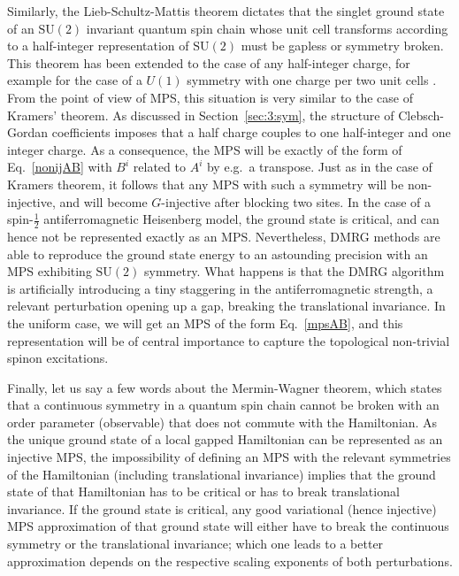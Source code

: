\documentclass[rmp,aps,reprint,superscriptaddress,nobalancelastpage]{revtex4-1}
\newcommand{\SU}{\mathrm{SU}}
\begin{document}
Similarly, the Lieb-Schultz-Mattis theorem dictates that the singlet ground state of an $\SU(2)$ invariant quantum spin chain whose unit cell transforms according to a half-integer representation of $\SU(2)$ must be gapless or symmetry broken. This theorem has been extended to the case of any half-integer charge, for example for the case of a $U(1)$ symmetry with one charge per two unit cells \cite{oshikawa1997magnetization}. From the point of view of MPS, this situation is very similar to the case of Kramers' theorem. As discussed in Section~\ref{sec:3:sym}, the structure of Clebsch-Gordan coefficients imposes that a half charge couples to one half-integer and one integer charge. As a consequence, the MPS will be exactly of the form of Eq.~\eqref{nonijAB} with $B^i$ related to $A^i$ by e.g.\ a transpose. Just as in the case of Kramers theorem, it follows that any MPS with such a symmetry will be non-injective, and will become $G$-injective after blocking two sites. In the case of a spin-$\tfrac12$ antiferromagnetic Heisenberg model, the ground state is critical, and can hence not be represented exactly as an MPS. Nevertheless, DMRG  methods are able to reproduce the ground state energy to an astounding precision with an MPS exhibiting $\SU(2)$ symmetry. What happens is that the DMRG algorithm is artificially introducing a tiny staggering in the antiferromagnetic strength, a relevant perturbation opening up a gap, breaking the translational invariance. In the uniform case, we will get an MPS of the form Eq.~\eqref{mpsAB}, and this representation will be of central importance to capture the topological non-trivial spinon excitations.

Finally, let us say a few words about the Mermin-Wagner theorem, which states that a continuous symmetry in a quantum spin chain cannot be broken with an order parameter (observable) that does not commute with the Hamiltonian. As the unique ground state of a local gapped Hamiltonian can be represented as an injective MPS, the impossibility of defining an MPS with the relevant symmetries of the Hamiltonian (including translational invariance) implies that the ground state of that Hamiltonian has to be critical or has to break translational invariance.  If the ground state is critical, any good variational (hence injective) MPS approximation of that ground state will either have to break the continuous symmetry or the translational invariance;  which one leads to a better approximation depends on the respective scaling exponents of both perturbations.
\end{document}
